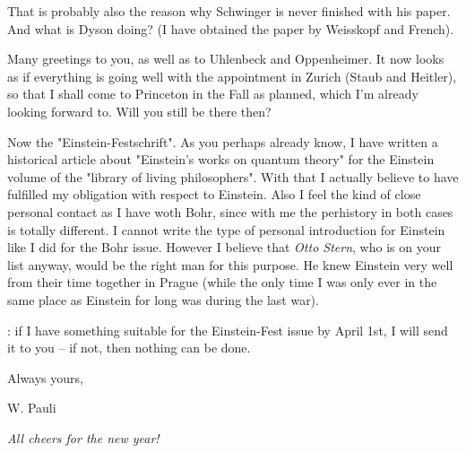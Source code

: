 \documentclass{article}
\begin{document}
That is probably also the reason why Schwinger is never finished with his paper. And what is Dyson doing? (I have obtained the paper by Weisskopf and French).

Many greetings to you, as well as to Uhlenbeck and Oppenheimer. It now looks as if everything is going well with the appointment in Zurich (Staub and Heitler), so that I shall come to Princeton in the Fall as planned, which I'm already looking forward to. Will you still be there then?

Now the "Einstein-Festschrift". As you perhaps already know, I have written a historical article about "Einstein's works on quantum theory" for the Einstein volume of the "library of living philosophers". With that I actually believe to have fulfilled my obligation with respect to Einstein. Also I feel the kind of close personal contact as I have woth Bohr, since with me the perhistory in both cases is totally different. I cannot write the type of personal introduction for Einstein like I did for the Bohr issue. However I believe that \textit{Otto Stern}, who is on your list anyway, would be the right man for this purpose. He knew Einstein very well from their time together in Prague (while the only time I was only ever in the same place as Einstein for long was during the last war).

: if I have something suitable for the Einstein-Fest issue by April 1st, I will send it to you -- if not, then nothing can be done.

Always yours,

W. Pauli

\textit{All cheers for the new year!}
\end{document}
